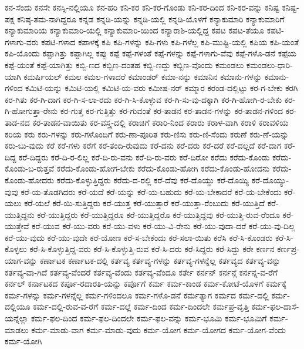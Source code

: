 {ಕನ-ಸೆಂದು
ಕನಸೇ
ಕನಸ್ಸಿ-ನಲ್ಲಿಯೂ
ಕನ-ಹರಿ
ಕನಿ-ಕರ
ಕನಿ-ಕರ-ಗೊಂಡು
ಕನಿ-ಕರ-ದಿಂದ
ಕನಿ-ಕರ-ವನ್ನು
ಕನಿಷ್ಟ
ಕನಿಷ್ಟ-ಪಕ್ಷ
ಕನಿಷ್ಠ-ತಮ-ನಾಗಿದ್ದರೂ
ಕನ್ನಡ
ಕನ್ನಡಿ-ಯನ್ನು
ಕನ್ನಡಿ-ಯಲ್ಲಿ
ಕನ್ನಡಿ-ಯೊಳಗೆ
ಕನ್ಯಾಕುಮಾರಿ
ಕನ್ಯಾಕುಮಾರಿಗೆ
ಕನ್ಯಾಕುಮಾರಿಯ
ಕನ್ಯಾಕುಮಾರಿ-ಯಲ್ಲಿ
ಕನ್ಯಾಕುಮಾರಿ-ಯಿಂದ
ಕನ್ಯಾರಾಶಿ-ಯಲ್ಲಿದ್ದ
ಕಪಟ
ಕಪಟ-ತೆಯೂ
ಕಪಟಿ-ಗಳಾಗು-ವರು
ಕಪಟಿ-ಗಳಾದ
ಕಪಾಳಕ್ಕೆ
ಕಪಿ
ಕಪಿ-ಗಳನ್ನು
ಕಪಿ-ಗಳು
ಕಪಿ-ಗಳೆಲ್ಲ
ಕಪಿ-ಮುಷ್ಟಿ-ಯಲ್ಲಿ
ಕಪಿಯ
ಕಪಿ-ಯಂತೆ
ಕಪಿ-ಯೊಂದು
ಕಪ್ಪಾಗಿತ್ತು
ಕಪ್ಪಾಗಿಲ್ಲ
ಕಪ್ಪು
ಕಪ್ಪೆ
ಕಪ್ಪೆ-ಗಳಂತೆ
ಕಪ್ಪೆ-ಗಳನ್ನು
ಕಪ್ಪೆ-ಗಳಾಗು-ವೆವು
ಕಪ್ಪೆ-ಗಳೊ-ಡನೆ
ಕಪ್ಪೆಯ
ಕಪ್ಪೆ-ಯಂತೆ
ಕಪ್ಪೆ-ಯಾಗಿತ್ತು
ಕಬ್ಬಿ-ಣದ
ಕಬ್ಬಿಣ-ದಂತಹ
ಕಬ್ಬಿ-ಣದ್ದು
ಕಬ್ಬಿಣ-ವೊಂದು
ಕಮಂಡಲು
ಕಮಂಡಲು-ಧಾರಿ-ಯಾಗಿ
ಕಮರ್ಷಿಯಲ್
ಕಮಲ
ಕಮಲ-ಗಳಾದರೆ
ಕಮಾಂಡರ್
ಕಮಾ-ನನ್ನು
ಕಮಾನಿನ
ಕಮಾನು-ಗಳನ್ನು
ಕಮಾನು-ಗಳಿಂದ
ಕಮಿಟಿ-ಯನ್ನು
ಕಮಿಟಿ-ಯಲ್ಲಿ
ಕಮಿಟಿ-ಯ-ವರು
ಕಮೀಷ-ನರ್
ಕಮ್ಮಾರ
ಕರಂಡ-ದಲ್ಲಿಟ್ಟು
ಕರ-ಗ-ಬೇಕು
ಕರಗಿ
ಕರ-ಗಿತು
ಕರ-ಗಿ-ದಾಗ
ಕರ-ಗಿ-ಸ-ಲಾ-ರದು
ಕರ-ಗಿ-ಸಿ-ಕೊಳ್ಳುವ
ಕರ-ಗಿ-ಸು-ವು-ದಕ್ಕಾಗಿ
ಕರ-ಗಿ-ಹೋಗಿ-ರ-ಬೇಕು
ಕರ-ಗಿ-ಹೋಗುತ್ತಾ-ರೇನು
ಕರ-ಗುತ್ತ
ಕರ-ಗುತ್ತಿತ್ತು
ಕರ-ಗುವಂತೆ
ಕರ-ತಾಡನ
ಕರ-ತಾಡನ-ಗಳನ್ನು
ಕರ-ತಾಡನ-ಗಳಿಂದ
ಕರ-ತಾಡ-ನದ
ಕರ-ತಾಡನ-ವಾಯಿತು
ಕರ-ವಸ್ತ್ರ-ದಲ್ಲಿ
ಕರಾಚಿಗೆ
ಕರಾರಿ-ನಿಂದ
ಕರಾರು
ಕರಾಳ-ವಾಗಿ
ಕರಾಳಿ
ಕರಾವಳಿಯ
ಕರಿಯ
ಕರು
ಕರು-ಗಳನ್ನು
ಕರು-ಗಳೊಂದಿಗೆ
ಕರು-ಣಾ-ಪೂರಿತ
ಕರು-ಣಿಸು
ಕರು-ಣಿ-ಸೆಂದು
ಕರುಣೆ
ಕರು-ಣೆ-ಯನ್ನು
ಕರು-ಬು-ವುದು
ಕರೆ
ಕರೆ-ಗಳು
ಕರೆಗೆ
ಕರೆ-ತಂದಿ-ರುವುದು
ಕರೆ-ದನು
ಕರೆ-ದರು
ಕರೆ-ದರೆ
ಕರೆ-ದಲ್ಲದೆ
ಕರೆ-ದಾಗ
ಕರೆ-ದಿದ್ದ
ಕರೆ-ದಿದ್ದರು
ಕರೆ-ದಿ-ರ-ಲಿಲ್ಲ
ಕರೆ-ದಿ-ರು-ವನು
ಕರೆ-ದಿ-ರು-ವರು
ಕರೆ-ದಿರೋ
ಕರೆದು
ಕರೆದು-ಕೊಂಡು
ಕರೆದು-ಕೊಂಡು-ಬ-ರುತ್ತವೆ
ಕರೆದು-ಕೊಂಡು-ಹೋಗ-ಬೇಕು
ಕರೆದು-ಕೊಂಡು-ಹೋಗಿ
ಕರೆದು-ಕೊಂಡು-ಹೋದನು
ಕರೆದು-ಕೊಂಡು-ಹೋದರು
ಕರೆದು-ಕೊಳ್ಳುತ್ತಿದ್ದರು
ಕರೆದು-ದ-ರಲ್ಲಿ
ಕರೆ-ದೆವು
ಕರೆ-ದೊಯ್ದು
ಕರೆ-ದೊಯ್ಯಿ
ಕರೆ-ದೊಯ್ಯು-ವುವು
ಕರೆ-ಯ-ತೊಡಗಿದರು
ಕರೆ-ಯದೆ
ಕರೆ-ಯನ್ನು
ಕರೆ-ಯ-ಬಹುದು
ಕರೆ-ಯ-ಬೇಕಾದರೆ
ಕರೆ-ಯ-ಬೇಕೆಂದು
ಕರೆ-ಯಲು
ಕರೆ-ಯಲೆ
ಕರೆ-ಯಿ-ಸುತ್ತಿದ್ದರು
ಕರೆ-ಯುತ್ತ
ಕರೆ-ಯುತ್ತಾರೆ
ಕರೆ-ಯುತ್ತಾ-ರೆಂಬುದು
ಕರೆ-ಯುತ್ತಿದೆ
ಕರೆ-ಯುತ್ತಿದ್ದನು
ಕರೆ-ಯುತ್ತಿದ್ದರು
ಕರೆ-ಯುತ್ತಿದ್ದರೂ
ಕರೆ-ಯುತ್ತಿದ್ದರೊ
ಕರೆ-ಯುತ್ತಿದ್ದವು
ಕರೆ-ಯುತ್ತಿ-ರುವ-ರೆಂದೂ
ಕರೆ-ಯುತ್ತೇವೆ
ಕರೆ-ಯುವ
ಕರೆ-ಯು-ವರು
ಕರೆ-ಯು-ವಳು
ಕರೆ-ಯು-ವಿ-ರೇನು
ಕರೆ-ಯು-ವುದಾ-ದರೆ
ಕರೆ-ಯು-ವು-ದಿಲ್ಲ
ಕರೆ-ಯು-ವುದು
ಕರೆ-ಯು-ವುದೇ
ಕರೆ-ಯೋಣ
ಕರೆ-ಸ-ಬೇಕೆಂದು
ಕರೆ-ಸಲಾ-ಯಿತು
ಕರೆಸಿ
ಕರೆ-ಸಿ-ಕೊಂಡರು
ಕರೆ-ಸಿ-ಕೊಳ್ಳಲು
ಕರೆ-ಸಿ-ಕೊಳ್ಳುತ್ತಿದ್ದ-ವರು
ಕರೆ-ಸಿ-ಕೊಳ್ಳುತ್ತಿ-ರುವ
ಕರೆ-ಸಿ-ದರು
ಕರೆ-ಸಿದ್ದರು
ಕರೆ-ಸಿದ್ದು
ಕರೇ
ಕರ್ಣನ
ಕರ್ಣಪ್ರ-ಯಾಗ-ವನ್ನು
ಕರ್ಣಾಟಕ
ಕರ್ಣಾಟಕ-ದಲ್ಲಿ
ಕರ್ತವ್ಯ
ಕರ್ತವ್ಯ-ಗಳನ್ನು
ಕರ್ತವ್ಯ-ಗಳನ್ನೆಲ್ಲ
ಕರ್ತವ್ಯದ
ಕರ್ತವ್ಯ-ವನ್ನು
ಕರ್ತವ್ಯ-ವಾ-ಗಿದೆ
ಕರ್ತವ್ಯ-ವೆಂದರೆ
ಕರ್ತವ್ಯ-ವೆಂದು
ಕರ್ತವ್ಯ-ವೆಂದೂ
ಕರ್ತೇ
ಕರ್ನನ್
ಕರ್ನನ್ಗೆ
ಕರ್ನನ್ನ-ವ-ರೆಗೆ
ಕರ್ನಲ್
ಕರ್ನಾಟಕದ
ಕರ್ಪೂ-ರದಾರತಿ-ಯನ್ನು
ಕರ್ಪೊಗೆ
ಕರ್ಮ
ಕರ್ಮ-ಕಾಂಡ
ಕರ್ಮ-ಕೋಟೆ-ಯೊಳಗೆ
ಕರ್ಮಕ್ಕೆ
ಕರ್ಮ-ಗಳನ್ನು
ಕರ್ಮ-ಗಳನ್ನೆಲ್ಲ
ಕರ್ಮ-ಗಳಿಂದಲೂ
ಕರ್ಮ-ಗಳೊ-ಡನೆ
ಕರ್ಮತ್ಯಾಗ
ಕರ್ಮದ
ಕರ್ಮ-ದಲ್ಲಿ
ಕರ್ಮ-ದಲ್ಲಿಯೂ
ಕರ್ಮ-ದಲ್ಲಿ-ರುವ-ವ-ರೆಗೆ
ಕರ್ಮ-ದಲ್ಲೆ
ಕರ್ಮ-ದಿಂದ
ಕರ್ಮ-ದಿಂದಲೇ
ಕರ್ಮಪ್ರ-ವೃತ್ತಿ
ಕರ್ಮ-ಫಲ-ದಾಸೆ-ಯನ್ನೆಲ್ಲಾ
ಕರ್ಮ-ಫಲ-ದಿಂದ
ಕರ್ಮ-ಫಲ-ದಿಂದಲೇ
ಕರ್ಮ-ಫಲ-ವನ್ನು
ಕರ್ಮ-ಭೂಮಿ
ಕರ್ಮ-ಭೂಮಿಗೆ
ಕರ್ಮ-ಮಾಡಲು
ಕರ್ಮ-ಮಾಡು-ವಾಗ
ಕರ್ಮ-ಮಾಡು-ವುದು
ಕರ್ಮ-ಯೋಗ
ಕರ್ಮ-ಯೋಗದ
ಕರ್ಮ-ಯೋಗ-ವೆಂದು
ಕರ್ಮ-ಯೋಗಿ
}
